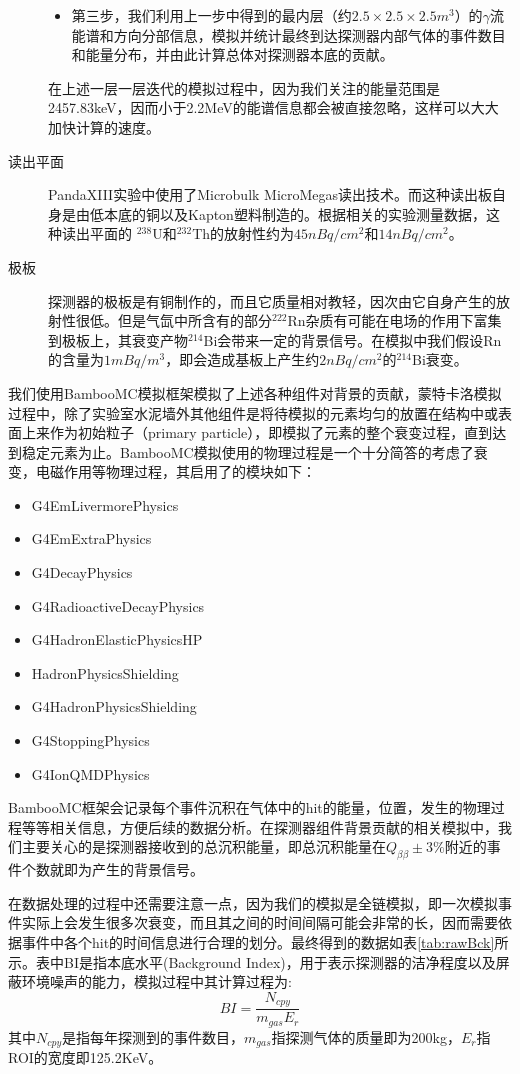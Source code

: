 \begin{description}
\begin{itemize}
        \item 第三步，我们利用上一步中得到的最内层（约$2.5\times2.5\times2.5m^3$）的$\gamma$流能谱和方向分部信息，模拟并统计最终到达探测器内部气体的事件数目和能量分布，并由此计算总体对探测器本底的贡献。
    \end{itemize}
    在上述一层一层迭代的模拟过程中，因为我们关注的能量范围是2457.83keV，因而小于2.2MeV的能谱信息都会被直接忽略，这样可以大大加快计算的速度。
    \item[读出平面]PandaXIII实验中使用了Microbulk MicroMegas读出技术。而这种读出板自身是由低本底的铜以及Kapton塑料制造的。根据相关的实验测量数据，这种读出平面的
    $^{238}$U和$^{232}$Th的放射性约为$45nBq/cm^2$和$14nBq/cm^2$。
    \item[极板]探测器的极板是有铜制作的，而且它质量相对教轻，因次由它自身产生的放射性很低。但是气氙中所含有的部分$^{222}$Rn杂质有可能在电场的作用下富集到极板上，其衰变产物$^{214}$Bi会带来一定的背景信号。在模拟中我们假设Rn的含量为$1mBq/m^3$，即会造成基板上产生约$2nBq/cm^2$的$^{214}$Bi衰变。
\end{description}

我们使用BambooMC模拟框架模拟了上述各种组件对背景的贡献，蒙特卡洛模拟过程中，除了实验室水泥墙外其他组件是将待模拟的元素均匀的放置在结构中或表面上来作为初始粒子（primary particle），即模拟了元素的整个衰变过程，直到达到稳定元素为止。BambooMC模拟使用的物理过程是一个十分简答的考虑了衰变，电磁作用等物理过程，其启用了的模块如下：
\begin{itemize}
    \item G4EmLivermorePhysics
    \item G4EmExtraPhysics
    \item G4DecayPhysics
    \item G4RadioactiveDecayPhysics
    \item G4HadronElasticPhysicsHP
    \item HadronPhysicsShielding
    \item G4HadronPhysicsShielding
    \item G4StoppingPhysics
    \item G4IonQMDPhysics     
\end{itemize}
BambooMC框架会记录每个事件沉积在气体中的hit的能量，位置，发生的物理过程等等相关信息，方便后续的数据分析。在探测器组件背景贡献的相关模拟中，我们主要关心的是探测器接收到的总沉积能量，即总沉积能量在$Q_{\beta\beta}\pm3\%$附近的事件个数就即为产生的背景信号。

在数据处理的过程中还需要注意一点，因为我们的模拟是全链模拟，即一次模拟事件实际上会发生很多次衰变，而且其之间的时间间隔可能会非常的长，因而需要依据事件中各个hit的时间信息进行合理的划分。最终得到的数据如表\ref{tab:rawBck}所示。表中BI是指本底水平(Background Index)，用于表示探测器的洁净程度以及屏蔽环境噪声的能力，模拟过程中其计算过程为:
\begin{equation}
    BI = \frac{N_{cpy}}{m_{gas}E_{r}}
    \label{eq:bi}
\end{equation}
其中$N_{cpy}$是指每年探测到的事件数目，$m_{gas}$指探测气体的质量即为200kg，$E_{r}$指ROI的宽度即125.2KeV。

